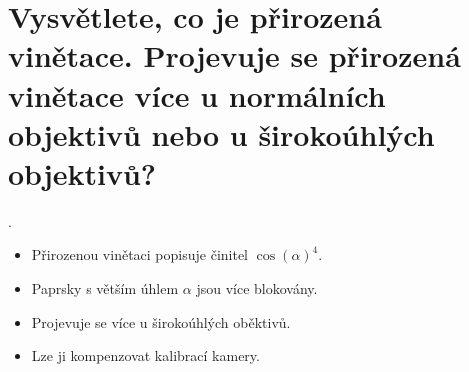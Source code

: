 \section{Vysvětlete, co je přirozená vinětace. Projevuje se přirozená vinětace více u normálních objektivů nebo u 
širokoúhlých objektivů?}.

\begin{figure}[H]
  \center
\end{figure}
\begin{itemize}
  \item
    Přirozenou vinětaci popisuje činitel $\cos(\alpha)^4$.
  \item
    Paprsky s větším úhlem $\alpha$ jsou více blokovány.
  \item
    Projevuje se více u širokoúhlých oběktivů.
  \item
    Lze ji kompenzovat kalibrací kamery.    
\end{itemize}
